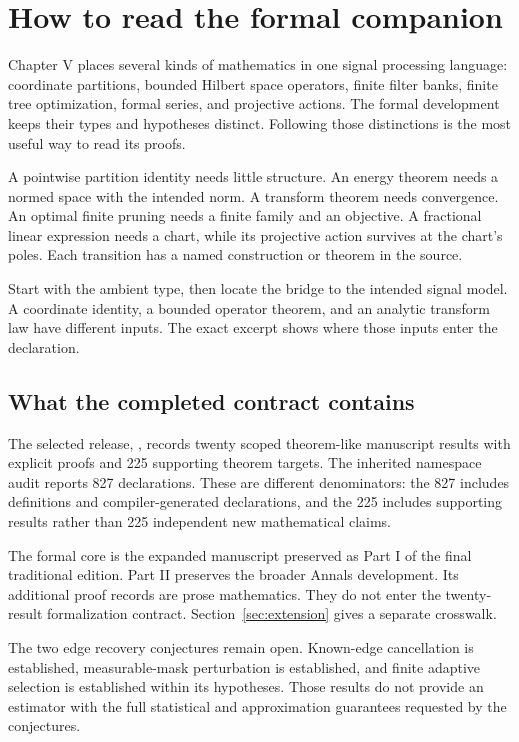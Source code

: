 \section{How to read the formal companion}
\label{sec:reading}
Chapter V places several kinds of mathematics in one signal processing language: coordinate partitions, bounded Hilbert space operators, finite filter banks, finite tree optimization, formal series, and projective actions. The formal development keeps their types and hypotheses distinct. Following those distinctions is the most useful way to read its proofs.

A pointwise partition identity needs little structure. An energy theorem needs a normed space with the intended norm. A transform theorem needs convergence. An optimal finite pruning needs a finite family and an objective. A fractional linear expression needs a chart, while its projective action survives at the chart's poles. Each transition has a named construction or theorem in the source.

\begin{keyidea}[title={Follow the model before the theorem name}]
Start with the ambient type, then locate the bridge to the intended signal model. A coordinate identity, a bounded operator theorem, and an analytic transform law have different inputs. The exact excerpt shows where those inputs enter the declaration.
\end{keyidea}

\subsection{What the completed contract contains}
The selected release, , records twenty scoped theorem-like manuscript results with explicit proofs and 225 supporting theorem targets. The inherited namespace audit reports 827 declarations. These are different denominators: the 827 includes definitions and compiler-generated declarations, and the 225 includes supporting results rather than 225 independent new mathematical claims.

The formal core is the expanded manuscript preserved as Part I of the final traditional edition. Part II preserves the broader Annals development. Its additional proof records are prose mathematics. They do not enter the twenty-result formalization contract. Section~\ref{sec:extension} gives a separate crosswalk.

The two edge recovery conjectures remain open. Known-edge cancellation is established, measurable-mask perturbation is established, and finite adaptive selection is established within its hypotheses. Those results do not provide an estimator with the full statistical and approximation guarantees requested by the conjectures.

